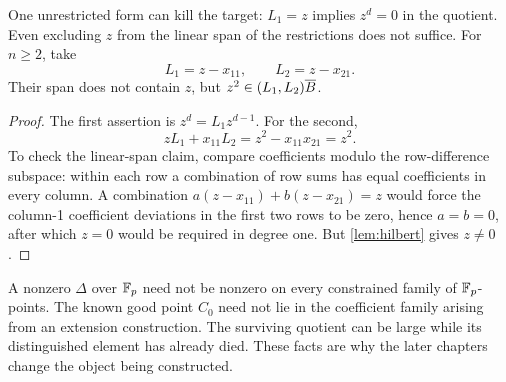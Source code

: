 \begin{lemma}\label{lem:linearobstructions}
One unrestricted form can kill the target: $L_1=z$ implies $z^d=0$ in the quotient. Even excluding $z$ from the linear span of the restrictions does not suffice. For $n\ge2$, take
\[
 L_1=z-x_{11},\qquad L_2=z-x_{21}.
\]
Their span does not contain $z$, but $z^2\in(L_1,L_2)\overline B$.
\end{lemma}
\begin{proof}
The first assertion is $z^d=L_1z^{d-1}$. For the second,
\[
 zL_1+x_{11}L_2=z^2-x_{11}x_{21}=z^2.
\]
To check the linear-span claim, compare coefficients modulo the row-difference subspace: within each row a combination of row sums has equal coefficients in every column. A combination $a(z-x_{11})+b(z-x_{21})=z$ would force the column-1 coefficient deviations in the first two rows to be zero, hence $a=b=0$, after which $z=0$ would be required in degree one. But \cref{lem:hilbert} gives $z\ne0$.
\end{proof}

\begin{remark}
A nonzero $\Delta$ over $\mathbb F_p$ need not be nonzero on every constrained family of $\mathbb F_p$-points. The known good point $C_0$ need not lie in the coefficient family arising from an extension construction. The surviving quotient can be large while its distinguished element has already died. These facts are why the later chapters change the object being constructed.
\end{remark}
